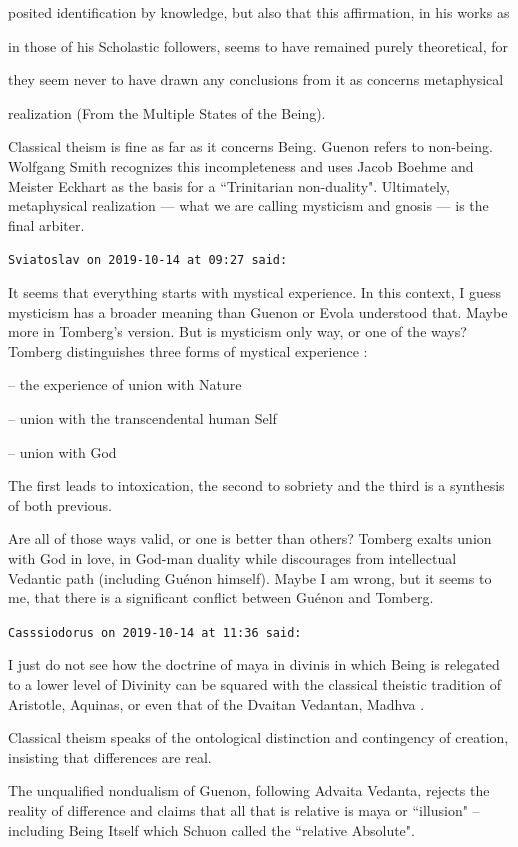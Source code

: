 \begin{footnotesize}
\begin{sffamily}
posited identification by knowledge, but also that this affirmation, in his works as

in those of his Scholastic followers, seems to have remained purely theoretical, for

they seem never to have drawn any conclusions from it as concerns metaphysical

realization (From the Multiple States of the Being).

Classical theism is fine as far as it concerns Being. Guenon refers to non-being. Wolfgang Smith recognizes this
incompleteness and uses Jacob Boehme and Meister Eckhart as the basis for a ``Trinitarian non-duality". Ultimately,
metaphysical realization — what we are calling mysticism and gnosis — is the
final arbiter.


\hfill

\texttt{Sviatoslav on 2019-10-14 at 09:27 said: }

It seems that everything starts with mystical experience. In this context, I guess mysticism has a broader meaning than
Guenon or Evola understood that. Maybe more in Tomberg's version. But is mysticism only way, or one of
the ways? Tomberg distinguishes three forms of mystical experience :

– the experience of union with Nature

– union with the transcendental human Self

– union with God

The first leads to intoxication, the second to sobriety and the third is a synthesis of both previous. 

Are all of those ways valid, or one is better than others? Tomberg exalts union with God in love, in God-man duality
while discourages from intellectual Vedantic path (including Guénon himself). Maybe I am wrong, but it seems to me,
that there is a significant conflict between Guénon and Tomberg.


\hfill

\texttt{Casssiodorus on 2019-10-14 at 11:36 said: }

I just do not see how the doctrine of maya in divinis in which Being is relegated to a lower level of Divinity can be
squared with the classical theistic tradition of Aristotle, Aquinas, or even that of the Dvaitan Vedantan, Madhva
.

Classical theism speaks of the ontological distinction and contingency of creation, insisting that differences are real.


The unqualified nondualism of Guenon, following Advaita Vedanta, rejects the reality of difference and claims that all
that is relative is maya or ``illusion" – including Being Itself which Schuon called the ``relative Absolute".


\end{sffamily}
\end{footnotesize}
